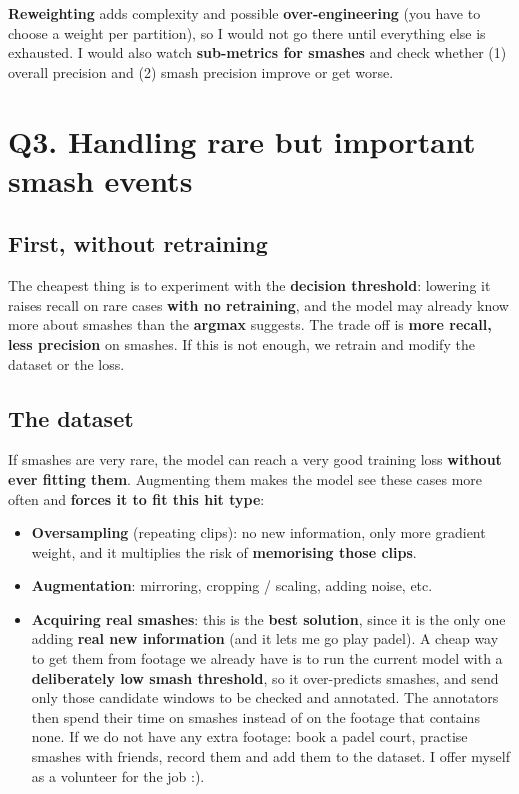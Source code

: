 \documentclass[11pt,a4paper]{article}
\begin{document}
\textbf{Reweighting} adds complexity and possible \textbf{over-engineering} (you have to
choose a weight per partition), so I would not go there until everything else is exhausted.
I would also watch \textbf{sub-metrics for smashes} and check whether (1) overall precision
and (2) smash precision improve or get worse.

\section*{Q3. Handling rare but important smash events}

\subsection*{First, without retraining}

The cheapest thing is to experiment with the \textbf{decision threshold}: lowering it raises
recall on rare cases \textbf{with no retraining}, and the model may already know more about
smashes than the \textbf{argmax} suggests. The trade off is \textbf{more recall, less
precision} on smashes. If this is not enough, we retrain and modify the dataset or the loss.

\subsection*{The dataset}

If smashes are very rare, the model can reach a very good training loss \textbf{without ever
fitting them}. Augmenting them makes the model see these cases more often and \textbf{forces
it to fit this hit type}:

\begin{itemize}
  \item \textbf{Oversampling} (repeating clips): no new information, only more gradient
    weight, and it multiplies the risk of \textbf{memorising those clips}.
  \item \textbf{Augmentation}: mirroring, cropping / scaling, adding noise, etc.
  \item \textbf{Acquiring real smashes}: this is the \textbf{best solution}, since it is
    the only one adding \textbf{real new information} (and it lets me go play padel). A
    cheap way to get them from footage we already have is to run the current model with a
    \textbf{deliberately low smash threshold}, so it over-predicts smashes, and send only those
    candidate windows to be checked and annotated. The annotators then spend their time on
    smashes instead of on the footage that contains none. If we do not have any extra footage:
    book a padel court, practise smashes with friends, record them and add them to the dataset.
    I offer myself as a volunteer for the job :).
\end{itemize}
\end{document}
